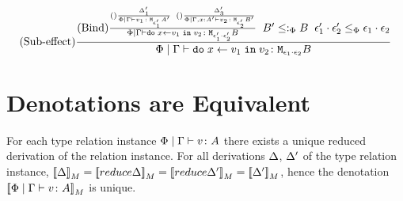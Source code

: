 \documentclass{report}
\begin{document}
            \begin{equation}
                (\text{Sub-effect}) \frac{
                    (\text{Bind}) \frac{
                        (\text{}) \frac{
                            \Delta'_1
                        }{
                            \Phi\mid\Gamma \vdash v_1 \colon \texttt{M}_{\epsilon_1'}{A'}
                        }
                        \;\;
                        (\text{}) \frac{
                            \Delta'_3
                        }{
                            \Phi\mid\Gamma, x: A' \vdash v_2 \colon \texttt{M}_{\epsilon_2'}{B'}
                        }
                    }{
                    \Phi\mid\Gamma \vdash \texttt{do}\; x \leftarrow v_1 \;\texttt{in}\; v_2 \colon \texttt{M}_{\epsilon_1'\cdot\epsilon_2'}{B}
                    }
                    \;\;
                    B' \leq:_\Phi B
                    \;\;
                    \epsilon_1'\cdot\epsilon_2'\leq_{\Phi}\epsilon_1\cdot\epsilon_2
                }{
                    \Phi\mid\Gamma \vdash \texttt{do}\; x \leftarrow v_1 \;\texttt{in}\; v_2 \colon \texttt{M}_{\epsilon_1\cdot\epsilon_2}{B}
                }
            \end{equation}
        


\section{Denotations are Equivalent}
For each type relation instance $\Phi\mid\Gamma \vdash v \colon A$ there exists a unique reduced derivation of the relation instance. For all derivations $\Delta$, $\Delta'$ of the type relation instance, $\deno{\D} = \deno{\reduce{\D}} = \deno{\reduce{\D'}} = \deno{\D'} $, hence the denotation ${\bf [\![}\Phi\mid\Gamma \vdash v \colon A{\bf ]\!]}_M$ is unique.
\end{document}
